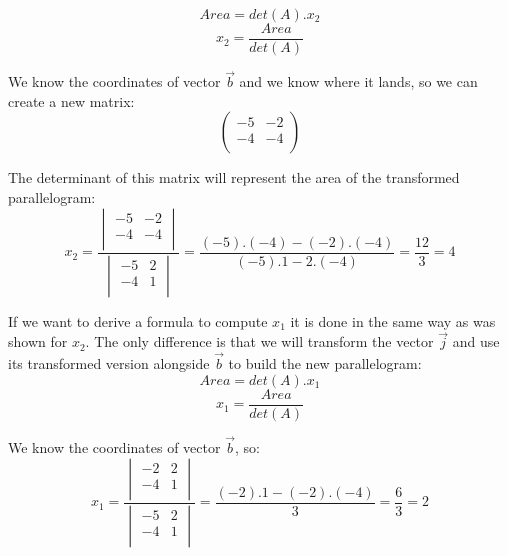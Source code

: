 \documentclass[a4,12pt,twosided,openany]{memoir}
\begin{document}
\[Area = det(A).x_2\]
\[x_2 = \frac{Area}{det(A)}\]
\par 
\indent
We know the coordinates of vector $\overrightarrow{b}$ and we know where it lands, so we can create a new matrix:
\[\begin{pmatrix}
-5 & -2  \\
-4 & -4 \\
\end{pmatrix}
\]
\par 
\indent
The determinant of this matrix will represent the area of the transformed parallelogram:
\[
x_2 = \frac{\begin{vmatrix}
-5 & -2  \\
-4 & -4 \\
\end{vmatrix} }{\begin{vmatrix}
-5 & 2  \\
-4 & 1 \\
\end{vmatrix}} = \frac{(-5).(-4) - (-2).(-4)}{(-5).1 -2.(-4)} = \frac{12}{3} = 4 
\]
\par 
\indent
If we want to derive a formula to compute $x_1$ it is done in the same way as was shown for $x_2$. The only difference is that we will transform the vector $\overrightarrow{j}$ and use its transformed version alongside $\overrightarrow{b}$ to build the new parallelogram:
\[Area =det(A).x_1\]
\[x_1 = \frac{Area}{det(A)}\]
\par 
\indent
We know the coordinates of vector $\overrightarrow{b}$, so:
\[x_1 = \frac{\begin{vmatrix}
 -2 & 2 \\
  -4 & 1\\
\end{vmatrix} }{\begin{vmatrix}
-5 & 2  \\
-4 & 1 \\
\end{vmatrix}} = \frac{(-2).1 - (-2).(-4)}{3} = \frac{6}{3} = 2 \]
\par 
\indent
\end{document}
